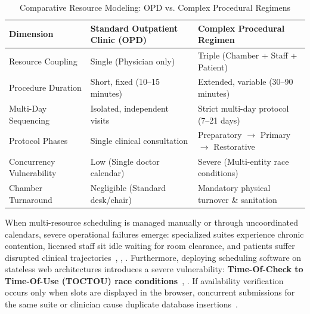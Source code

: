 \documentclass[conference]{IEEEtran}
\begin{document}
\begin{table}[t]
\centering
\caption{Comparative Resource Modeling: OPD vs. Complex Procedural Regimens}
\label{tab:opd_vs_procedural}
\begin{tabular}{@{}lll@{}}
\toprule
\textbf{Dimension} & \textbf{Standard Outpatient Clinic (OPD)} & \textbf{Complex Procedural Regimen} \\
\midrule
Resource Coupling & Single (Physician only)~\cite{gupta2008appointment} & Triple (Chamber + Staff + Patient)~\cite{vanessen2014breaking} \\
Procedure Duration & Short, fixed (10--15 minutes)~\cite{cayirli2003outpatient} & Extended, variable (30--90 minutes)~\cite{singh2008holistic} \\
Multi-Day Sequencing & Isolated, independent visits~\cite{cayirli2003outpatient} & Strict multi-day protocol (7--21 days)~\cite{singh2008holistic} \\
Protocol Phases & Single clinical consultation & Preparatory $\rightarrow$ Primary $\rightarrow$ Restorative \\
Concurrency Vulnerability & Low (Single doctor calendar) & Severe (Multi-entity race conditions)~\cite{bishop1996checking} \\
Chamber Turnaround & Negligible (Standard desk/chair) & Mandatory physical turnover \& sanitation \\
\bottomrule
\end{tabular}
\end{table}

When multi-resource scheduling is managed manually or through uncoordinated calendars, severe operational failures emerge: specialized suites experience chronic contention, licensed staff sit idle waiting for room clearance, and patients suffer disrupted clinical trajectories~\cite{vanessen2014breaking}, \cite{samudra2016scheduling}, \cite{schimmelpfeng2021operating}. Furthermore, deploying scheduling software on stateless web architectures introduces a severe vulnerability: \textbf{Time-Of-Check to Time-Of-Use (TOCTOU) race conditions}~\cite{bishop1996checking}, \cite{panda2022concurrency}. If availability verification occurs only when slots are displayed in the browser, concurrent submissions for the same suite or clinician cause duplicate database insertions~\cite{panda2022concurrency}.
\end{document}
